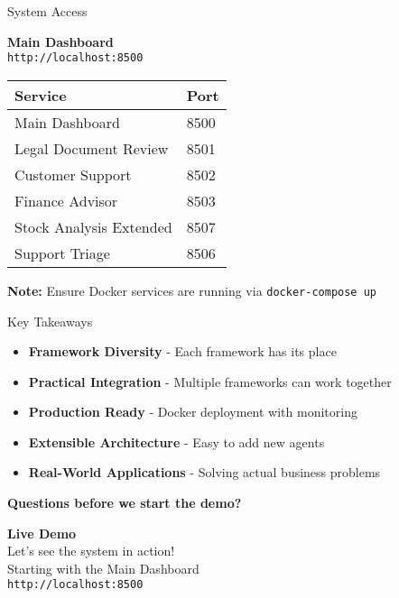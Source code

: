 \documentclass[aspectratio=169,11pt]{beamer}
\begin{document}
\begin{frame}{System Access}
\begin{center}
\Large
\textbf{Main Dashboard}\\
\vspace{0.3cm}
 \texttt{http://localhost:8500}\\
\vspace{1cm}

\normalsize
\begin{tabular}{ll}
\toprule
\textbf{Service} & \textbf{Port} \\
\midrule
Main Dashboard & 8500 \\
Legal Document Review & 8501 \\
Customer Support & 8502 \\
Finance Advisor & 8503 \\
Stock Analysis Extended & 8507 \\
Support Triage & 8506 \\
\bottomrule
\end{tabular}
\end{center}

\vspace{0.5cm}
\textbf{Note:} Ensure Docker services are running via \texttt{docker-compose up}
\end{frame}

\begin{frame}{Key Takeaways}
\begin{itemize}
    \item \textbf{Framework Diversity} - Each framework has its place
    \vspace{0.3cm}
    \item \textbf{Practical Integration} - Multiple frameworks can work together
    \vspace{0.3cm}
    \item \textbf{Production Ready} - Docker deployment with monitoring
    \vspace{0.3cm}
    \item \textbf{Extensible Architecture} - Easy to add new agents
    \vspace{0.3cm}
    \item \textbf{Real-World Applications} - Solving actual business problems
\end{itemize}

\vspace{0.5cm}
\begin{center}
\Large
\textbf{Questions before we start the demo?}
\end{center}
\end{frame}

\begin{frame}
\begin{center}
\Huge
\textbf{Live Demo}\\
\vspace{1cm}
\Large
Let's see the system in action!\\
\vspace{0.5cm}
\normalsize
Starting with the Main Dashboard\\
\texttt{http://localhost:8500}
\end{center}
\end{frame}
\end{document}

